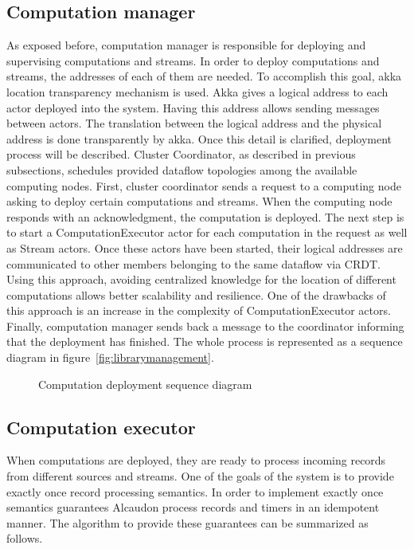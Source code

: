\subsection{Computation manager}

As exposed before, computation manager is responsible for deploying and
supervising computations and streams. In order to deploy computations and
streams, the addresses of each of them are needed. To accomplish this
goal, akka location transparency mechanism is used. Akka gives a logical address
to each actor deployed into the system. Having this address allows sending
messages between actors. The translation between the logical address and the
physical address is done transparently by akka. Once this detail is
clarified, deployment process will be described. Cluster Coordinator, as
described in previous subsections, schedules provided dataflow topologies among
the available computing nodes. First, cluster coordinator sends a request to a
computing node asking to deploy certain computations and streams. When the computing
node responds with an acknowledgment, the computation is deployed. The next
step is to start a ComputationExecutor actor for each computation in the request
as well as Stream actors. Once these actors have been started, their logical
addresses are communicated to other members belonging to the same dataflow via
\acs{CRDT}. Using this approach, avoiding centralized knowledge for the location
of different computations allows better scalability and resilience. One of the
drawbacks of this approach is an increase in the complexity of ComputationExecutor
actors. Finally, computation manager sends back a message to the coordinator
informing that the deployment has finished. The whole process is represented as
a sequence diagram in figure~\ref{fig:librarymanagement}.

\begin{figure}[!h]
  \centering
  \scalebox{0.40}{
    
  }
  \caption{Computation deployment sequence diagram}
  \label{fig:deployment}
\end{figure}

\subsection{Computation executor}

When computations are deployed, they are ready to process incoming records from
different sources and streams. One of the goals of the system is to provide
exactly once record processing semantics. In order to implement exactly once
semantics guarantees Alcaudon process records and timers in an idempotent
manner. The algorithm to provide these guarantees can be summarized as follows.

